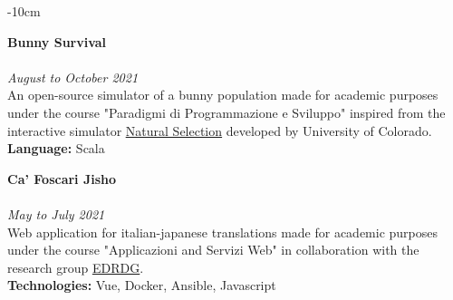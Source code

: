 \documentclass[10pt,a4paper]{altacv}
\begin{document}
\begin{adjustwidth}{}{-10cm}
    \divider

    \textbf{Bunny Survival}\\
    \\
    \textit{August to October 2021}\\ \smallskip
    An open-source simulator of a bunny population made for academic purposes under the course "Paradigmi di Programmazione e Sviluppo" inspired from the interactive simulator \href{https://phet.colorado.edu/en/simulations/natural-selection}{\underline{Natural Selection}} developed by University of Colorado.\\ \smallskip
    \textbf{Language:} Scala

    \divider

    \textbf{\textbf{Ca' Foscari Jisho}}\\
    \\
    \textit{May to July 2021} \\ \smallskip
    Web application for italian-japanese translations made for academic purposes under the course "Applicazioni and Servizi Web" in collaboration with the research group \href{http://www.edrdg.org}{\underline{EDRDG}}.\\ \smallskip
    \textbf{Technologies:} Vue, Docker, Ansible, Javascript

    \divider
\end{adjustwidth}
\end{document}
